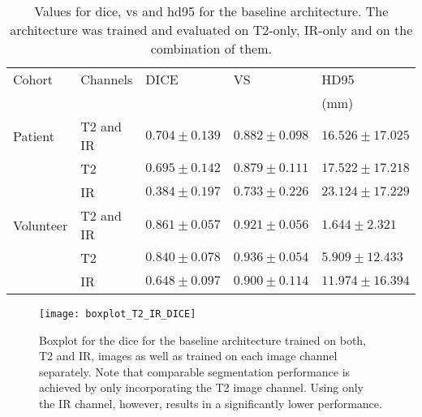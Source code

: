 \begin{table}[htbp]
   \centering
   \caption[Metrics for Baseline with different Input Channels]{Values for \acrlong{dice}, \acrlong{vs} and \acrlong{hd95} for the baseline architecture. The architecture was trained and evaluated on T2-only, IR-only and on the combination of them.}
   \begin{tabular}{l*{4}{l}}
      \toprule
      Cohort	& Channels  & DICE              & VS				& HD95\\
      			&			&					&					& (mm)\\
      \midrule
      Patient   & T2 and IR & $\mathbf{0.704 \pm 0.139}$& $\mathbf{0.882 \pm 0.098}$ & $\mathbf{16.526 \pm 17.025}$ \\
                & T2        & $0.695 \pm 0.142 $& $0.879 \pm 0.111$ & $ 17.522 \pm 17.218$ \\
                & IR        & $0.384 \pm 0.197 $& $0.733 \pm 0.226$ & $ 23.124 \pm 17.229$ \\
      \midrule
      Volunteer & T2 and IR & $\mathbf{0.861 \pm 0.057 }$& $0.921 \pm 0.056$ & $\mathbf{1.644 \pm 2.321}$ \\
                & T2        & $0.840 \pm 0.078 $& $\mathbf{0.936 \pm 0.054}$ & $ 5.909 \pm 12.433$ \\
                & IR        & $0.648 \pm 0.097 $& $0.900 \pm 0.114$ & $ 11.974 \pm 16.394$ \\
      \bottomrule
   \end{tabular}
   \label{tab:results_feasibility}
\end{table}

\begin{figure}[htbp]
	\centering
	\texttt{[image: boxplot\_T2\_IR\_DICE]}
    \caption[Boxplot for the \acrlong{dice} for the Baseline trained on T2 and IR separately.]{Boxplot for the \acrlong{dice} for the baseline architecture trained on both, T2 and IR, images as well as trained on each image channel separately. Note that comparable segmentation performance is achieved by only incorporating the T2 image channel. Using only the IR channel, however, results in a significantly lower performance.}
    \label{fig:results_boxplot_T2_IR_dice}
\end{figure}

